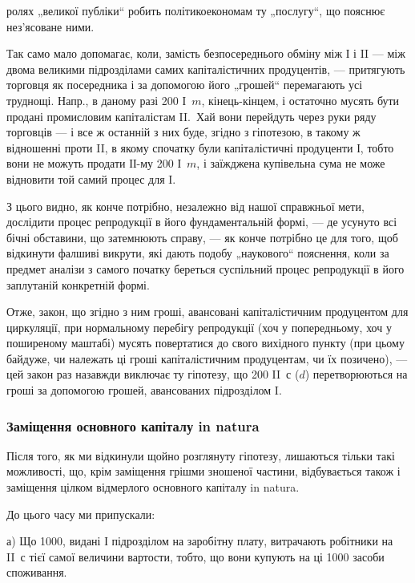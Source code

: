 \parcont{}  %
ролях „великої публіки“ робить політикоекономам ту „послугу“, що
пояснює нез’ясоване ними.

Так само мало допомагає, коли, замість безпосереднього обміну між
І і II — між двома великими підрозділами самих капіталістичних продуцентів,
— притягують торговця як посередника і за допомогою його „грошей“
перемагають усі труднощі. Напр., в даному разі 200 І~$m$, кінець-кінцем,
і остаточно мусять бути продані промисловим капіталістам II.~Хай вони
перейдуть через руки ряду торговців — і все ж останній з них буде, згідно
з гіпотезою, в такому ж відношенні проти II, в якому спочатку були
капіталістичні продуценти І, тобто вони не можуть продати ІІ-му 200 І~$m$,
і заїжджена купівельна сума не може відновити той самий процес для I.

З цього видно, як конче потрібно, незалежно від нашої справжньої
мети, дослідити процес репродукції в його фундаментальній формі, —
де усунуто всі бічні обставини, що затемнюють справу, — як конче
потрібно це для того, щоб відкинути фалшиві викрути, які дають подобу
„наукового“ пояснення, коли за предмет аналізи з самого початку
береться суспільний процес репродукції в його заплутаній конкретній
формі.

Отже, закон, що згідно з ним гроші, авансовані капіталістичним продуцентом
для циркуляції, при нормальному перебігу репродукції (хоч у
попередньому, хоч у поширеному маштабі) мусять повертатися до свого
вихідного пункту (при цьому байдуже, чи належать ці гроші капіталістичним
продуцентам, чи їх позичено), — цей закон раз назавжди виключає
ту гіпотезу, що 200 II~$с$ ($d$) перетворюються на гроші за допомогою
грошей, авансованих підрозділом I.

\subsubsection{Заміщення основного капіталу in natura}

Після того, як ми відкинули щойно розглянуту гіпотезу, лишаються
тільки такі можливості, що, крім заміщення грішми зношеної частини, відбувається
також і заміщення цілком відмерлого основного капіталу in natura.

До цього часу ми припускали:

\medskip{}
а) Що 1000, видані І підрозділом на заробітну плату, витрачають
робітники на II~$с$ тієї самої величини вартости, тобто, що вони
купують на ці 1000 засоби споживання.

